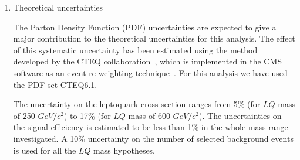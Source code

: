 \begin{enumerate}

\item Theoretical uncertainties 

The Parton Density Function (PDF) uncertainties are expected to give 
a major contribution to the theoretical uncertainties for this analysis.  
The effect of this systematic uncertainty has been estimated
using the method developed by the CTEQ collaboration~\cite{Martin:2003sk},
which is implemented in the CMS software as an event re-weighting technique~\cite{PDFRescaling}.
For this analysis we have used the PDF set CTEQ6.1.



The uncertainty on the leptoquark cross section ranges 
from 5\% (for $LQ$ mass of 250 $GeV/c^2$) to 17\% (for $LQ$ mass of 600 $GeV/c^2$).  
The uncertainties on the signal efficiency is estimated to be less 
than 1\% in the whole mass range investigated.
A 10\% uncertainty on the number of selected background events is used for all the 
$LQ$ mass hypotheses. 


\end{enumerate}
